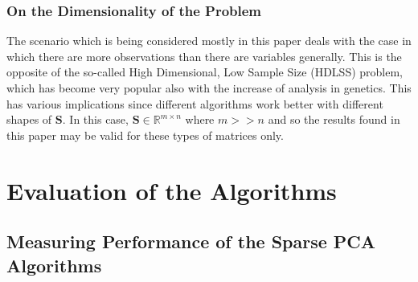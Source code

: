 \documentclass[11pt,a4paper]{article}
\newcommand{\inreal}{\in \mathbb{R}}
\newcommand{\smat}{\mathbf{S}}
\begin{document}




\subsubsection{On the Dimensionality of the Problem}
The scenario which is being considered mostly in this paper deals with the case in which there are more observations than there are variables generally. This is the opposite of the so-called High Dimensional, Low Sample Size (HDLSS) problem, which has become very popular also with the increase of analysis in genetics. This has various implications since different algorithms work better with different shapes of $\smat$. In this case, $\smat \inreal^{m\times n}$ where $m >> n$ and so the results found in this paper may be valid for these types of matrices only. 


\clearpage

\section{Evaluation of the Algorithms}
\subsection{Measuring Performance of the Sparse PCA Algorithms}
\end{document}

